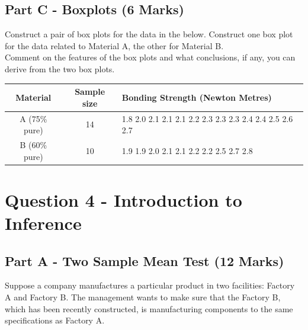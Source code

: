 \documentclass[a4paper,12pt]{article}
\begin{document}
\subsection*{Part C - Boxplots (6 Marks)}
Construct a pair of box plots for the data in the below. Construct one box plot for the data related to Material A, the other for Material B. \\ \medskip \noindent Comment on the features of the box plots and what conclusions, if any, you can derive from the two box plots.
\begin{center}
	\begin{tabular}{|c|c|l|}
		\hline
		Material & Sample size & Bonding Strength (Newton Metres) \\ \hline
		
		A (75\% pure) & 14 & 1.8 2.0 2.1 2.1 2.1 2.2 2.3 2.3 2.3 2.4 2.4 2.5 2.6 2.7 \phantom{sp}
		\\ \hline
		
		B (60\% pure) & 10 & 1.9 1.9 2.0 2.1 2.1 2.2 2.2 2.5 2.7 2.8 \\ \hline
	\end{tabular} 
\end{center}
\medskip


\section*{Question 4 - Introduction to Inference}



\subsection*{Part A - Two Sample Mean Test (12 Marks)}
Suppose a company manufactures a particular product in two facilities: Factory A and Factory B.
The management wants to make sure that the Factory B, which has been recently constructed, is manufacturing 
components to the same specifications as Factory A. \\ \smallskip
\end{document}
